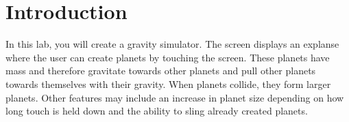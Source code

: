 \section{Introduction}

In this lab, you will create a gravity simulator.
The screen displays an explanse where the user can create planets by touching the screen.
These planets have mass and therefore gravitate towards other planets and pull other planets towards themselves with their gravity.
When planets collide, they form larger planets.
Other features may include an increase in planet size depending on how long touch is held down and the ability to sling already created planets.